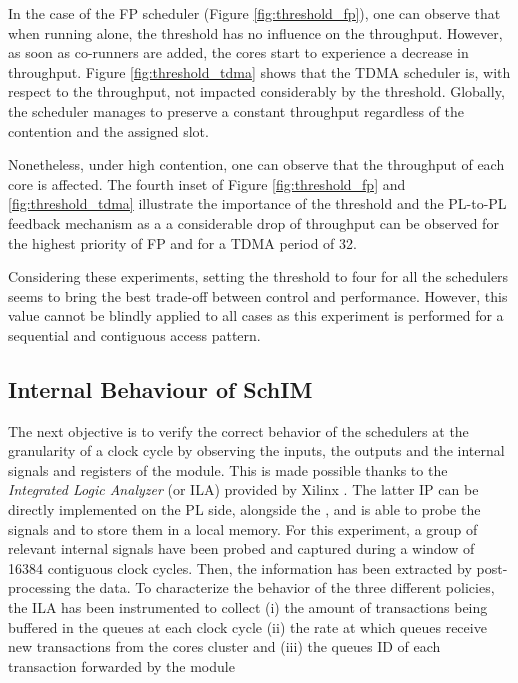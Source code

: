 In the case of the FP scheduler (Figure \ref{fig:threshold_fp}), one can observe
that when running alone, the threshold has no influence on the throughput.
However, as soon as co-runners are added, the cores start to experience a
decrease in throughput.
Figure \ref{fig:threshold_tdma} shows that the TDMA scheduler is, with respect to the throughput, not impacted considerably by the threshold. Globally, the
scheduler manages to preserve a constant throughput regardless of the contention
and the assigned slot.

Nonetheless, under high
contention, one can observe that the throughput of each core is affected.
The fourth inset of Figure \ref{fig:threshold_fp} and \ref{fig:threshold_tdma}
illustrate the importance of the threshold and the PL-to-PL feedback mechanism as a
a considerable drop of throughput can be observed for the highest priority of FP
and for a TDMA period of 32.

Considering these experiments, setting the threshold to four for all the schedulers
seems to bring the best trade-off between control and performance. However, this
value cannot be blindly applied to all cases as this experiment is performed for
a sequential and contiguous access pattern.

\subsection{Internal Behaviour of SchIM}
\label{subsec:internal-behaviour-of-schim}
The next objective is to verify the correct behavior of the schedulers
at the granularity of a clock cycle by observing the inputs,
the outputs and the internal signals and registers of the \schim
module. This is made possible thanks to the \emph{Integrated Logic
  Analyzer} (or ILA) provided by Xilinx \cite{Xilinx-ILA}. The latter
IP can be directly implemented on the PL side, alongside the \schim,
and is able to probe the signals and to store them in a local
memory. For this experiment, a group of relevant internal signals have
been probed and captured during a window of 16384 contiguous clock
cycles. Then, the information has been extracted by post-processing
the data. To characterize the behavior of the three different
policies, the ILA has been instrumented to collect (i) the amount of
transactions being buffered in the queues at each clock cycle
(ii) the rate at which queues receive
new transactions from the cores cluster
 and (iii) the queues ID of each
transaction forwarded by the \schim module


